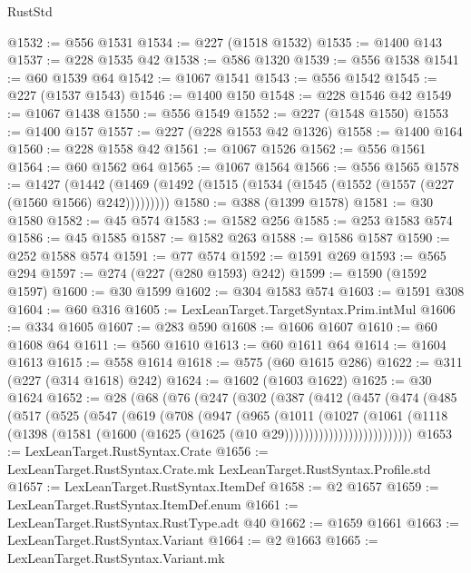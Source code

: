 \begin{lexlean}{RustStd}
\begin{coremodule}
{\begin{coremodule}
{{{{{{{{{{{{{{{{{{{{{{{{{{{{{@1532 := @556 @1531
@1534 := @227 (@1518 @1532)
@1535 := @1400 @143
@1537 := @228 @1535 @42
@1538 := @586 @1320
@1539 := @556 @1538
@1541 := @60 @1539 @64
@1542 := @1067 @1541
@1543 := @556 @1542
@1545 := @227 (@1537 @1543)
@1546 := @1400 @150
@1548 := @228 @1546 @42
@1549 := @1067 @1438
@1550 := @556 @1549
@1552 := @227 (@1548 @1550)
@1553 := @1400 @157
@1557 := @227 (@228 @1553 @42 @1326)
@1558 := @1400 @164
@1560 := @228 @1558 @42
@1561 := @1067 @1526
@1562 := @556 @1561
@1564 := @60 @1562 @64
@1565 := @1067 @1564
@1566 := @556 @1565
@1578 := @1427
    (@1442 (@1469 (@1492 (@1515 (@1534 (@1545 (@1552 (@1557 (@227 (@1560 @1566) @242)))))))))
@1580 := @388 (@1399 @1578)
@1581 := @30 @1580
@1582 := @45 @574
@1583 := @1582 @256
@1585 := @253 @1583 @574
@1586 := @45 @1585
@1587 := @1582 @263
@1588 := @1586 @1587
@1590 := @252 @1588 @574
@1591 := @77 @574
@1592 := @1591 @269
@1593 := @565 @294
@1597 := @274 (@227 (@280 @1593) @242)
@1599 := @1590 (@1592 @1597)
@1600 := @30 @1599
@1602 := @304 @1583 @574
@1603 := @1591 @308
@1604 := @60 @316
@1605 := LexLeanTarget.TargetSyntax.Prim.intMul
@1606 := @334 @1605
@1607 := @283 @590
@1608 := @1606 @1607
@1610 := @60 @1608 @64
@1611 := @560 @1610
@1613 := @60 @1611 @64
@1614 := @1604 @1613
@1615 := @558 @1614
@1618 := @575 (@60 @1615 @286)
@1622 := @311 (@227 (@314 @1618) @242)
@1624 := @1602 (@1603 @1622)
@1625 := @30 @1624
@1652 := @28
    (@68
      (@76
        (@247
          (@302
            (@387
              (@412
                (@457
                  (@474
                    (@485
                      (@517
                        (@525
                          (@547
                            (@619
                              (@708
                                (@947
                                  (@965
                                    (@1011
                                      (@1027
                                        (@1061
                                          (@1118
                                            (@1398
                                              (@1581
                                                (@1600
                                                  (@1625 (@1625 (@10 @29))))))))))))))))))))))))))
@1653 := LexLeanTarget.RustSyntax.Crate
@1656 := LexLeanTarget.RustSyntax.Crate.mk LexLeanTarget.RustSyntax.Profile.std
@1657 := LexLeanTarget.RustSyntax.ItemDef
@1658 := @2 @1657
@1659 := LexLeanTarget.RustSyntax.ItemDef.enum
@1661 := LexLeanTarget.RustSyntax.RustType.adt @40
@1662 := @1659 @1661
@1663 := LexLeanTarget.RustSyntax.Variant
@1664 := @2 @1663
@1665 := LexLeanTarget.RustSyntax.Variant.mk
}}}}}}}}}}}}}}}}}}}}}}}}}}}}}
\end{coremodule}}
\end{coremodule}
\end{lexlean}
